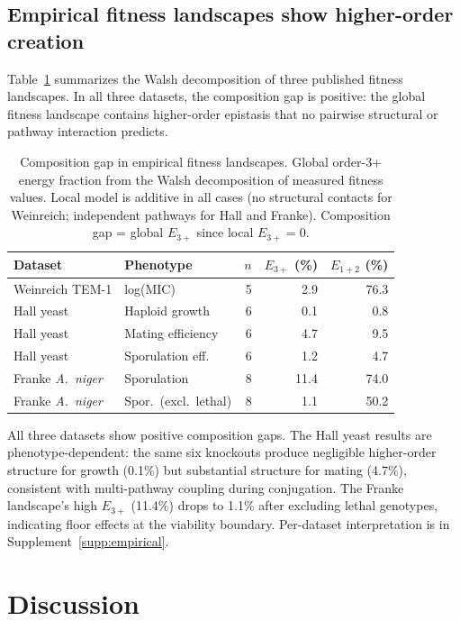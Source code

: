 \documentclass[10pt]{article}
\begin{document}
\subsection{Empirical fitness landscapes show higher-order creation}
\label{sec:empirical-results}

Table~\ref{tab:empirical} summarizes the Walsh decomposition of three
published fitness landscapes. In all three datasets, the composition
gap is positive: the global fitness landscape contains higher-order
epistasis that no pairwise structural or pathway interaction
predicts.

\begin{table}[t]
\centering
\caption{Composition gap in empirical fitness landscapes. Global
order-3+ energy fraction from the Walsh decomposition of measured
fitness values. Local model is additive in all cases (no structural
contacts for Weinreich; independent pathways for Hall and Franke).
Composition gap = global $E_{3+}$ since local $E_{3+} = 0$.}
\label{tab:empirical}
\begin{tabular}{llrrr}
\toprule
Dataset & Phenotype & $n$ & $E_{3+}$ (\%) & $E_{1+2}$ (\%) \\
\midrule
Weinreich TEM-1 & log(MIC) & 5 & 2.9 & 76.3 \\
Hall yeast & Haploid growth & 6 & 0.1 & 0.8 \\
Hall yeast & Mating efficiency & 6 & 4.7 & 9.5 \\
Hall yeast & Sporulation eff. & 6 & 1.2 & 4.7 \\
Franke \emph{A.~niger} & Sporulation & 8 & 11.4 & 74.0 \\
Franke \emph{A.~niger} & Spor.\ (excl.\ lethal) & 8 & 1.1 & 50.2 \\
\bottomrule
\end{tabular}
\end{table}

All three datasets show positive composition gaps. The Hall yeast
results are phenotype-dependent: the same six knockouts produce
negligible higher-order structure for growth (0.1\%) but substantial
structure for mating (4.7\%), consistent with multi-pathway coupling
during conjugation. The Franke landscape's high $E_{3+}$ (11.4\%)
drops to 1.1\% after excluding lethal genotypes, indicating floor
effects at the viability boundary. Per-dataset interpretation is in
Supplement~\ref{supp:empirical}.


\section{Discussion}
\label{sec:discussion}
\end{document}

